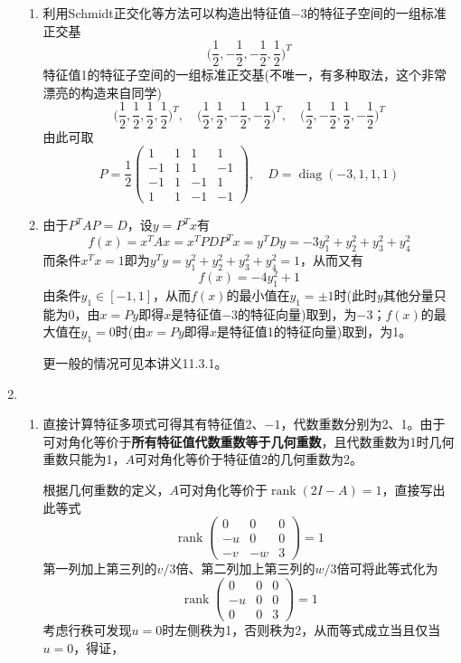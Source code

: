 \documentclass[a4paper,UTF8,fontset=windows,AutoFakeBold]{ctexart}
\DeclareMathOperator{\diag}{diag}
\DeclareMathOperator{\rank}{rank}
\newcommand*{\note}{\noindent *}
\begin{document}
\begin{enumerate}
\begin{enumerate}
        \item 利用Schmidt正交化等方法可以构造出特征值$-3$的特征子空间的一组标准正交基
        $$\bigg(\frac{1}{2},-\frac{1}{2},-\frac{1}{2},\frac{1}{2}\bigg)^T$$
        特征值1的特征子空间的一组标准正交基(不唯一，有多种取法，这个非常漂亮的构造来自同学)
        $$\bigg(\frac{1}{2},\frac{1}{2},\frac{1}{2},\frac{1}{2}\bigg)^T,\quad\bigg(\frac{1}{2},\frac{1}{2},-\frac{1}{2},-\frac{1}{2}\bigg)^T,\quad\bigg(\frac{1}{2},-\frac{1}{2},\frac{1}{2},-\frac{1}{2}\bigg)^T$$
        由此可取
        $$P=\frac{1}{2}\begin{pmatrix}1&1&1&1\\-1&1&1&-1\\-1&1&-1&1\\1&1&-1&-1\end{pmatrix},\quad D=\diag(-3,1,1,1)$$

        \item 由于$P^TAP=D$，设$y=P^Tx$有
        $$f(x)=x^TAx=x^TPDP^Tx=y^TDy=-3y_1^2+y_2^2+y_3^2+y_4^2$$
        而条件$x^Tx=1$即为$y^Ty=y_1^2+y_2^2+y_3^2+y_4^2=1$，从而又有
        $$f(x)=-4y_1^2+1$$
        由条件$y_1\in[-1,1]$，从而$f(x)$的最小值在$y_1=\pm1$时(此时$y$其他分量只能为0，由$x=Py$即得$x$是特征值$-3$的特征向量)取到，为$-3$；$f(x)$的最大值在$y_1=0$时(由$x=Py$即得$x$是特征值1的特征向量)取到，为1。

        \note 更一般的情况可见本讲义11.3.1。
    \end{enumerate}

    \item
    \begin{enumerate}
        \item 直接计算特征多项式可得其有特征值2、$-1$，代数重数分别为2、1。由于可对角化等价于\textbf{所有特征值代数重数等于几何重数}，且代数重数为1时几何重数只能为1，$A$可对角化等价于特征值2的几何重数为2。
        
        根据几何重数的定义，$A$可对角化等价于$\rank(2I-A)=1$，直接写出此等式
        $$\rank\begin{pmatrix}0&0&0\\-u&0&0\\-v&-w&3\end{pmatrix}=1$$
        第一列加上第三列的$v/3$倍、第二列加上第三列的$w/3$倍可将此等式化为
        $$\rank\begin{pmatrix}0&0&0\\-u&0&0\\0&0&3\end{pmatrix}=1$$
        考虑行秩可发现$u=0$时左侧秩为1，否则秩为2，从而等式成立当且仅当$u=0$，得证，


\end{enumerate}
\end{enumerate}
\end{document}
